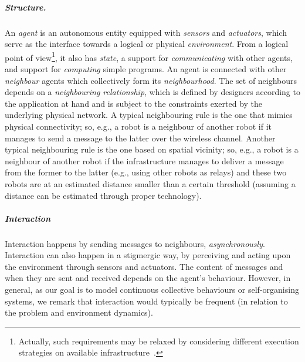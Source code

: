 \subparagraph*{Structure.}
%
An \emph{agent} is an autonomous entity
 equipped with \emph{sensors} and \emph{actuators}, which serve as the interface towards a logical or physical \emph{environment}.
%
From a logical point of view\footnote{Actually, such requirements may be relaxed by considering different execution strategies on available infrastructure~\cite{DBLP:journals/fi/CasadeiPPVW20}.}, 
 it also has \emph{state}, a support for \emph{communicating} with other agents, 
 and support for \emph{computing} simple programs.
%
An agent is connected with other \emph{neighbour} agents which collectively form its \emph{neighbourhood}.
%
The set of neighbours depends on a \emph{neighbouring relationship}, 
 which is defined by designers according to the application at hand
 and is subject to the constraints exerted by the underlying physical network.
%
A typical neighbouring rule
 is the one that mimics physical connectivity;
 so, e.g., a robot is a neighbour of another robot if it manages to send a message to the latter over the wireless channel.
%
Another typical neighbouring rule is the one
 based on spatial vicinity;
 so, e.g., a robot is a neighbour of another robot if the infrastructure manages to deliver a message from the former to the latter (e.g., using other robots as relays)
  and these two robots are at an estimated distance smaller than a certain threshold
  (assuming a distance can be estimated through proper technology).

\subparagraph*{Interaction}
%
Interaction happens by sending messages
 to neighbours, \emph{asynchronously}.
%
Interaction can also happen in a stigmergic way, 
 by perceiving and acting upon the environment through sensors and actuators.
%
The content of messages and when they are sent and received depends on the agent's behaviour.
%
However, in general, as our goal is to model continuous collective behaviours or self-organising systems,
 we remark that interaction would typically be frequent (in relation to the problem and environment dynamics).


